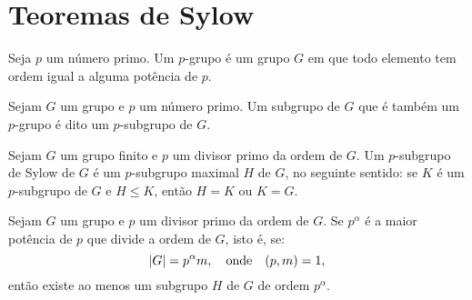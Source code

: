 \section{Teoremas de Sylow}\label{sec:teoremas-de-sylow}

\begin{definition}\label{def:p-grupo}
  Seja $p$ um número primo. Um $p$-grupo é um grupo $G$ em que todo elemento tem ordem igual a alguma potência de $p$.
\end{definition}

\begin{definition}
  Sejam $G$ um grupo e $p$ um número primo. Um subgrupo de $G$ que é também um $p$-grupo é dito um $p$-subgrupo de $G$.
\end{definition}

\begin{definition}\label{def:p-subgrupo-de-sylow}
  Sejam $G$ um grupo finito e $p$ um divisor primo da ordem de $G$. Um $p$-subgrupo de Sylow de $G$ é um $p$-subgrupo maximal $H$ de $G$, no seguinte sentido: se $K$ é um $p$-subgrupo de $G$ e $H\leqslant{K}$, então $H=K$ ou $K=G$.
\end{definition}

\begin{theorem}[Sylow]\label{thm:primeiro-teorema-de-sylow}
  Sejam $G$ um grupo e $p$ um divisor primo da ordem de $G$. Se $p^{\alpha}$ é a maior potência de $p$ que divide a ordem de $G$, isto é, se:
  \[
    \lvert G\rvert=p^{\alpha}m,\quad\text{onde}\quad(p,m)=1,
  \]
  então existe ao menos um subgrupo $H$ de $G$ de ordem $p^{\alpha}$.
\end{theorem}

